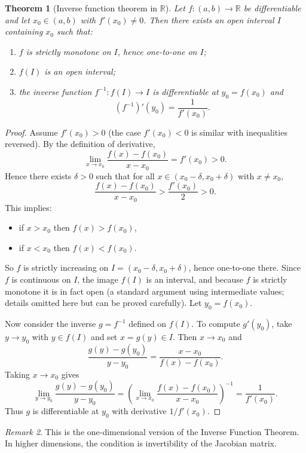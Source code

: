 \documentclass[12pt]{article}
\numberwithin{equation}{section}
\newcommand{\RR}{\mathbb{R}}
\theoremstyle{plain}
\newtheorem{theorem}{Theorem}[section]
\theoremstyle{definition}
\theoremstyle{remark}
\newtheorem{remark}[theorem]{Remark}
\begin{document}
\begin{theorem}[Inverse function theorem in $\RR$]\label{thm:ift-R}
Let $f:(a,b)\to\RR$ be differentiable and let $x_0\in(a,b)$ with $f'(x_0)\neq 0$.
Then there exists an open interval $I$ containing $x_0$ such that:
\begin{enumerate}[label=(\alph*)]
\item $f$ is strictly monotone on $I$, hence one-to-one on $I$;
\item $f(I)$ is an open interval;
\item the inverse function $f^{-1}:f(I)\to I$ is differentiable at $y_0=f(x_0)$ and
\[
(f^{-1})'(y_0)=\frac{1}{f'(x_0)}.
\]
\end{enumerate}
\end{theorem}

\begin{proof}
Assume $f'(x_0)>0$ (the case $f'(x_0)<0$ is similar with inequalities reversed).
By the definition of derivative,
\[
\lim_{x\to x_0}\frac{f(x)-f(x_0)}{x-x_0}=f'(x_0)>0.
\]
Hence there exists $\delta>0$ such that for all $x\in(x_0-\delta,x_0+\delta)$ with $x\neq x_0$,
\[
\frac{f(x)-f(x_0)}{x-x_0}>\frac{f'(x_0)}{2}>0.
\]
This implies:
\begin{itemize}
\item if $x>x_0$ then $f(x)>f(x_0)$,
\item if $x<x_0$ then $f(x)<f(x_0)$.
\end{itemize}
So $f$ is strictly increasing on $I=(x_0-\delta,x_0+\delta)$, hence one-to-one there.
Since $f$ is continuous on $I$, the image $f(I)$ is an interval, and because $f$ is strictly monotone it is in fact open (a standard argument using intermediate values; details omitted here but can be proved carefully).
Let $y_0=f(x_0)$.

Now consider the inverse $g=f^{-1}$ defined on $f(I)$.
To compute $g'(y_0)$, take $y\to y_0$ with $y\in f(I)$ and set $x=g(y)\in I$.
Then $x\to x_0$ and
\[
\frac{g(y)-g(y_0)}{y-y_0}=\frac{x-x_0}{f(x)-f(x_0)}.
\]
Taking $x\to x_0$ gives
\[
\lim_{y\to y_0}\frac{g(y)-g(y_0)}{y-y_0}
=
\left(\lim_{x\to x_0}\frac{f(x)-f(x_0)}{x-x_0}\right)^{-1}
=\frac{1}{f'(x_0)}.
\]
Thus $g$ is differentiable at $y_0$ with derivative $1/f'(x_0)$.
\end{proof}

\begin{remark}
This is the one-dimensional version of the Inverse Function Theorem.
In higher dimensions, the condition is invertibility of the Jacobian matrix.
\end{remark}
\end{document}
